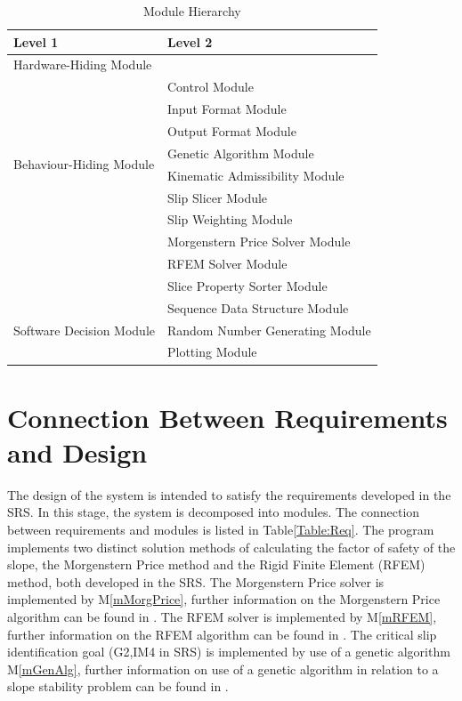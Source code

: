 \documentclass[12pt]{article}
\newcommand{\mref}[1]{M\ref{#1}}
\newcounter{tablenum}
\newcommand{\tableref}[1]{Table\ref{#1}}
\newcommand{\Tstrut}{\rule{0pt}{2.6ex}}         %
\begin{document}
\begin{table}[h!]
 \label{Table:Decomp}
\centering
\begin{tabular}{p{} p{} }
\toprule
\textbf{Level 1} & \textbf{Level 2} \\
\midrule

{Hardware-Hiding Module}\Tstrut  & ~ \\
\midrule
\multirow{8}{0.3\textwidth}{Behaviour-Hiding Module\rule{0pt}{4ex}} &
Control Module \\
\cline{2-1} & Input Format Module\Tstrut \\
\cline{2-1} & Output Format Module\Tstrut \\
\cline{2-1} & Genetic Algorithm Module\Tstrut \\
\cline{2-1} & Kinematic Admissibility Module \Tstrut \\
\cline{2-1} & Slip Slicer Module\Tstrut \\
\cline{2-1} & Slip Weighting Module\Tstrut \\
\cline{2-1} & Morgenstern Price Solver Module\Tstrut \\
\cline{2-1} & RFEM Solver Module\Tstrut \\
\cline{2-1} & Slice Property Sorter Module\Tstrut \\
\midrule
\multirow{3}{0.3\textwidth}{Software Decision Module\rule{0pt}{4ex}} &
Sequence Data Structure Module\Tstrut \\
\cline{2-1} & Random Number Generating Module\Tstrut \\
\cline{2-1}& Plotting Module\Tstrut \\
\bottomrule

\end{tabular}
\caption{Module Hierarchy}
\end{table}

\section{Connection Between Requirements
  and Design} \label{SecConnection}

\hspace{3ex}The design of the system is intended to satisfy the
requirements developed in the SRS. In this stage, the system is
decomposed into modules. The connection between requirements and
modules is listed in \tableref{Table:Req}. The program implements two
distinct solution methods of calculating the factor of safety of the
slope, the Morgenstern Price method and the Rigid Finite Element
(RFEM) method, both developed in the SRS. The Morgenstern Price solver
is implemented by \mref{mMorgPrice}, further information on the
Morgenstern Price algorithm can be found in \cite{ZhuEtAl2005}. The RFEM solver
is implemented by \mref{mRFEM}, further information on the RFEM
algorithm can be found in \cite{StolleGuo}. The critical slip identification
goal (G2,IM4 in SRS) is implemented by use of a genetic algorithm
\mref{mGenAlg}, further information on use of a genetic algorithm in
relation to a slope stability problem can be found in \cite{LiEtAl}.
\end{document}
